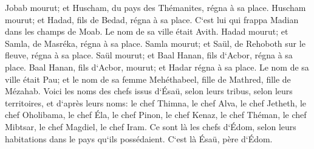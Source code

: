 \verse Jobab mourut; et Huscham, du pays des Thémanites, régna à sa place. 
\verse Huscham mourut; et Hadad, fils de Bedad, régna à sa place. C`est lui qui frappa Madian dans les champs de Moab. Le nom de sa ville était Avith. 
\verse Hadad mourut; et Samla, de Masréka, régna à sa place. 
\verse Samla mourut; et Saül, de Rehoboth sur le fleuve, régna à sa place. 
\verse Saül mourut; et Baal Hanan, fils d`Acbor, régna à sa place. 
\verse Baal Hanan, fils d`Acbor, mourut; et Hadar régna à sa place. Le nom de sa ville était Pau; et le nom de sa femme Mehéthabeel, fille de Mathred, fille de Mézahab. 
\verse Voici les noms des chefs issus d`Ésaü, selon leurs tribus, selon leurs territoires, et d`après leurs noms: le chef Thimna, le chef Alva, le chef Jetheth, 
\verse le chef Oholibama, le chef Éla, le chef Pinon, 
\verse le chef Kenaz, le chef Théman, le chef Mibtsar, 
\verse le chef Magdiel, le chef Iram. Ce sont là les chefs d`Édom, selon leurs habitations dans le pays qu`ils possédaient. C`est là Ésaü, père d`Édom. 


